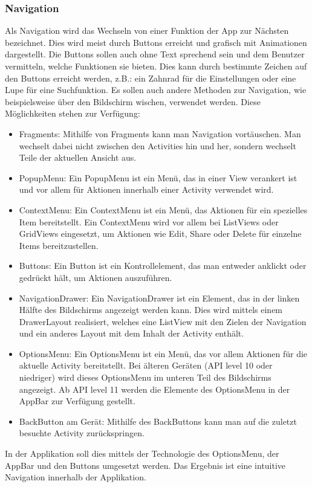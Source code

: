 \documentclass[FIPLY_base.tex]{subfiles}
\begin{document}
\newpage
\subsubsection{Navigation}
Als Navigation wird das Wechseln von einer Funktion der App zur Nächsten bezeichnet. Dies wird meist durch Buttons erreicht und grafisch mit Animationen dargestellt.
Die Buttons sollen auch ohne Text sprechend sein und dem Benutzer vermitteln, welche Funktionen sie bieten. Dies kann durch bestimmte Zeichen auf den Buttons erreicht werden, z.B.: ein Zahnrad für die Einstellungen oder eine Lupe für eine Suchfunktion. Es sollen auch andere Methoden zur Navigation, wie beispielsweise über den Bildschirm wischen, verwendet werden.
Diese Möglichkeiten stehen zur Verfügung:
\begin{itemize}
	\item Fragments: Mithilfe von Fragments kann man Navigation vortäuschen. Man wechselt dabei nicht zwischen den Activities hin und her, sondern wechselt Teile der aktuellen Ansicht aus.
	\item PopupMenu: Ein PopupMenu ist ein Menü, das in einer View verankert ist und vor allem für Aktionen innerhalb einer Activity verwendet wird.
	\item ContextMenu: Ein ContextMenu ist ein Menü, das Aktionen für ein spezielles Item bereitstellt. Ein ContextMenu wird vor allem bei ListViews oder GridViews eingesetzt, um Aktionen wie Edit, Share oder Delete für einzelne Items bereitzustellen.
	\item Buttons: Ein Button ist ein Kontrollelement, das man entweder anklickt oder gedrückt hält, um Aktionen auszuführen.
	\item NavigationDrawer: Ein NavigationDrawer ist ein Element, das in der linken Hälfte des Bildschirms angezeigt werden kann. Dies wird mittels einem DrawerLayout realisiert, welches eine ListView mit den Zielen der Navigation und ein anderes Layout mit dem Inhalt der Activity enthält.
	\item OptionsMenu: Ein OptionsMenu ist ein Menü, das vor allem Aktionen für die aktuelle Activity bereitstellt. 
	Bei älteren Geräten (API level 10 oder niedriger) wird dieses OptionsMenu im unteren Teil des Bildschirms angezeigt.
	Ab API level 11 werden die Elemente des OptionsMenu in der AppBar zur Verfügung gestellt.
	\item BackButton am Gerät: Mithilfe des BackButtons kann man auf die zuletzt besuchte Activity zurückspringen.
\end{itemize}
In der Applikation soll dies mittels der Technologie des OptionsMenu, der AppBar und den Buttons umgesetzt werden. Das Ergebnis ist eine intuitive Navigation innerhalb der Applikation.
\end{document}
